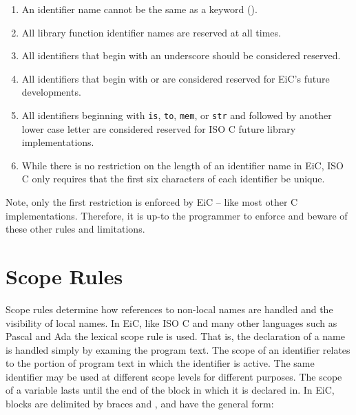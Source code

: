 \begin{enumerate}

\item An identifier name cannot be the same as a keyword ().

\item All library function identifier names are reserved at all times.

\item All identifiers that begin with an underscore should be 
        considered reserved. 

\item All identifiers that begin with  or  are considered
	reserved for EiC's future developments. 

\item All identifiers beginning with {\tt is}, {\tt to}, {\tt mem}, or 
        {\tt str} and followed by another lower case letter are
        considered reserved for ISO C future library
        implementations.

\item While there is no restriction on the length of an identifier name in EiC,
       ISO C only requires that the first six
        characters of each identifier be unique.
\end{enumerate}

Note, only the first restriction is enforced by EiC -- like most other C
implementations. Therefore, it is up-to the programmer to enforce and
beware of these other rules and limitations.


\section{Scope Rules}
\label{sec:ScopeRules}

Scope rules determine how references to non-local names are handled
and the visibility of local names. In EiC, like ISO C and many other
languages such as Pascal and Ada the lexical
scope rule is used. That is, the declaration of a
name is handled simply by examing the program text. The scope of an
identifier relates to the portion of program text in which the
identifier is active.  The same identifier may be used at different
scope levels for different purposes. The scope of a variable lasts
until the end of the block in which it is declared in.  In EiC,
blocks are delimited by  braces \T{\{} and \T{\}},
and have the general form:
\begin{production}
\end{production}

